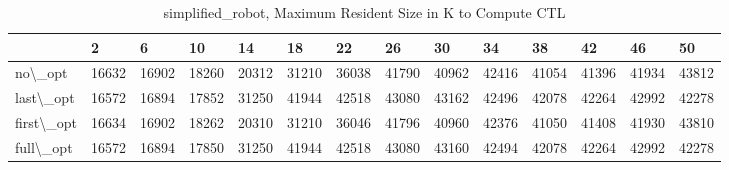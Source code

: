 \begin{table}
\centering
\caption{simplified\_robot, Maximum Resident Size in K to Compute CTL}
\label{simplified_robot_CTL_size}
\begin{tabular}{llllllllllllll}
\toprule
{} &      2 &      6 &     10 &     14 &     18 &     22 &     26 &     30 &     34 &     38 &     42 &     46 &     50 \\
\midrule
no\textbackslash \_opt    &  16632 &  16902 &  18260 &  20312 &  31210 &  36038 &  41790 &  40962 &  42416 &  41054 &  41396 &  41934 &  43812 \\
last\textbackslash \_opt  &  16572 &  16894 &  17852 &  31250 &  41944 &  42518 &  43080 &  43162 &  42496 &  42078 &  42264 &  42992 &  42278 \\
first\textbackslash \_opt &  16634 &  16902 &  18262 &  20310 &  31210 &  36046 &  41796 &  40960 &  42376 &  41050 &  41408 &  41930 &  43810 \\
full\textbackslash \_opt  &  16572 &  16894 &  17850 &  31250 &  41944 &  42518 &  43080 &  43160 &  42494 &  42078 &  42264 &  42992 &  42278 \\
\bottomrule
\end{tabular}
\end{table}
